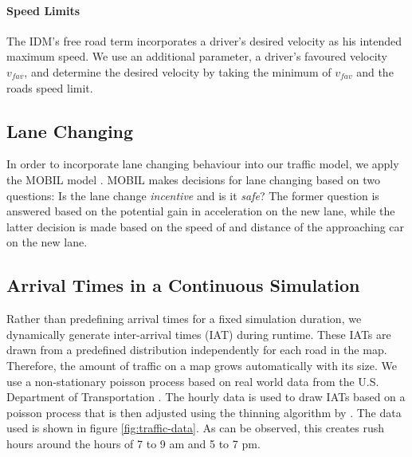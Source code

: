 \documentclass[11pt]{article}
\begin{document}
\paragraph{Speed Limits} The IDM's free road term incorporates a driver's desired velocity as his intended maximum speed. We use an additional parameter, a driver's favoured velocity $v_{fav}$, and determine the desired velocity by taking the minimum of $v_{fav}$ and the roads speed limit.

\subsection{Lane Changing}
In order to incorporate lane changing behaviour into our traffic model, we apply the MOBIL model \citep{treiber2002realistische, kesting2007general}. MOBIL makes decisions for lane changing based on two questions: Is the lane change \textit{incentive} and is it \textit{safe}? The former question is answered based on the potential gain in acceleration on the new lane, while the latter decision is made based on the speed of and distance of the approaching car on the new lane.

\subsection{Arrival Times in a Continuous Simulation}
Rather than predefining arrival times for a fixed simulation duration, we dynamically generate inter-arrival times (IAT) during runtime. These IATs are drawn from a predefined distribution independently for each road in the map. Therefore, the amount of traffic on a map grows automatically with its size. We use a non-stationary poisson process based on real world data from the U.S. Department of Transportation \citep{trafficdata}. The hourly data is used to draw IATs based on a poisson process that is then adjusted using the thinning algorithm by \citet{lewis1979simulation}. The data used is shown in figure \ref{fig:traffic-data}. As can be observed, this creates rush hours around the hours of 7 to 9 am and 5 to 7 pm.
\end{document}

